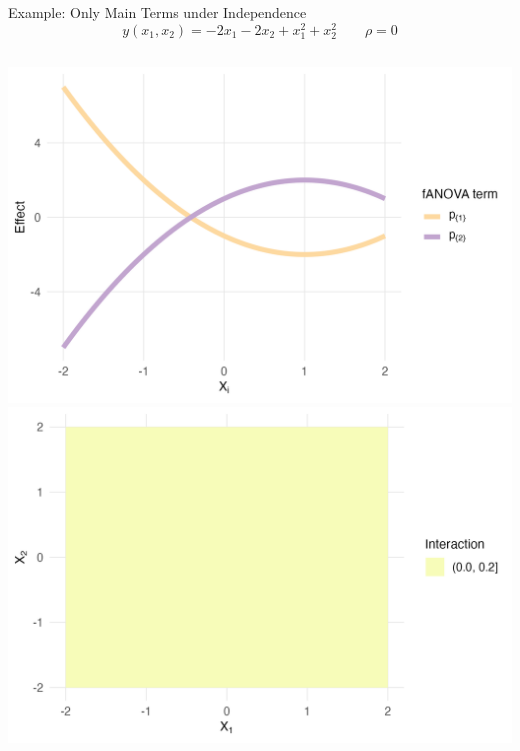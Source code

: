 \begin{frame}{Example: Only Main Terms under Independence}
  \[
  y(x_1, x_2) = -2 x_1 - 2x_2 + x_1^2 + x_2^2 \qquad \rho = 0
  \]
    \begin{columns}
      \includegraphics[width=\linewidth]{../images/experiment_section/mixed_a1m20_a2p20_a11p10_a22m10_a12p00_rhop00_main.png}
      \includegraphics[width=\linewidth]{../images/experiment_section/mixed_a1m20_a2p20_a11p10_a22m10_a12p00_rhop00_interaction.png}
  \end{columns}
\end{frame}


